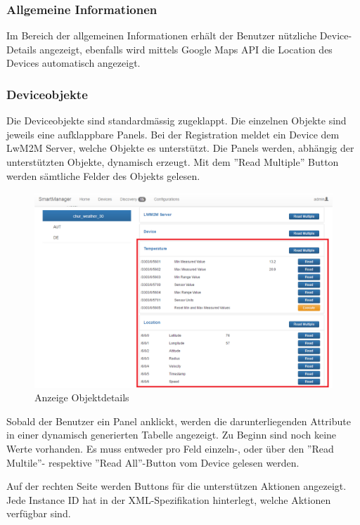 \subsubsection{Allgemeine Informationen}
Im Bereich der allgemeinen Informationen erhält der Benutzer nützliche Device-Details angezeigt, ebenfalls wird mittels Google Maps API die Location des Devices automatisch angezeigt.

\subsubsection{Deviceobjekte}
Die Deviceobjekte sind standardmässig zugeklappt. Die einzelnen Objekte sind jeweils eine aufklappbare Panels. Bei der Registration meldet ein Device dem LwM2M Server, welche Objekte es unterstützt. Die Panels werden, abhängig der unterstützten Objekte, dynamisch erzeugt. Mit dem ''Read Multiple'' Button werden sämtliche Felder des Objekts gelesen.

\begin{figure}[H]
\centering
\includegraphics[scale=0.57]{../04_Realisierung/images/userinterface/devicefragment.png}
\caption{Anzeige Objektdetails}
\end{figure}

Sobald der Benutzer ein Panel anklickt, werden die darunterliegenden Attribute in einer dynamisch generierten Tabelle angezeigt. Zu Beginn sind noch keine Werte vorhanden. Es muss entweder pro Feld einzeln-, oder über den ''Read Multile''- respektive ''Read All''-Button vom Device gelesen werden.

Auf der rechten Seite werden Buttons für die unterstützen Aktionen angezeigt. Jede Instance ID hat in der XML-Spezifikation hinterlegt, welche Aktionen verfügbar sind.

